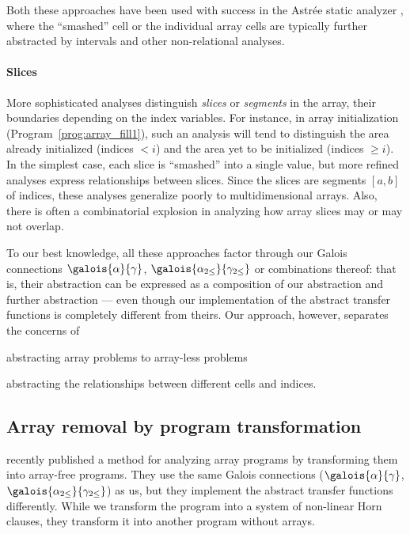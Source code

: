 \documentclass[a4paper]{article}
\theoremstyle{definition}
\theoremstyle{plain}
\begin{document}
Both these approaches have been used with success in the Astr\'ee static analyzer \cite{BlanchetCousotEtAl02-NJ,BlanchetCousotEtAl_PLDI03}, where the ``smashed'' cell or the individual array cells are typically further abstracted by intervals and other non-relational analyses.

\paragraph{Slices}
More sophisticated analyses \cite{GopanRS05,HalbwachsP08,peron:tel-00623697,perrelle:tel-00973892,CousotCL11} distinguish \emph{slices}
or \emph{segments} in the array, their boundaries depending on the index variables.
For instance, in array initialization (Program~\ref{prog:array_fill1}), such an analysis will tend to distinguish the area already initialized (indices $<i$) and the area yet to be initialized (indices $\geq i$).
In the simplest case, each slice is ``smashed'' into a single value, but more refined analyses express relationships between slices.
Since the slices are segments $[a,b]$ of indices, these analyses generalize poorly to multidimensional arrays.
Also, there is often a combinatorial explosion in analyzing how array slices may or may not overlap.

To our best knowledge, all these approaches factor through our Galois connections $\galois{\alpha}{\gamma}$, $\galois{\alpha_{2\leq}}{\gamma_{2\leq}}$ or combinations thereof: that is, their abstraction can be expressed as a composition of our abstraction and further abstraction
--- even though our implementation of the abstract transfer functions is completely different from theirs.
Our approach, however, separates the concerns of
\begin{inparaenum}[i)]
\item abstracting array problems to array-less problems
\item abstracting the relationships between different cells and indices.
\end{inparaenum}

\subsection{Array removal by program transformation}
\label{sec:abstraction_weak_transfo}
\citet{Monniaux_Alberti_SAS2015} recently published a method for analyzing array programs by transforming them into array-free programs.
They use the same Galois connections ($\galois{\alpha}{\gamma}$, $\galois{\alpha_{2\leq}}{\gamma_{2\leq}}$) as us, but they implement the abstract transfer functions differently.
While we transform the program into a system of non-linear Horn clauses, they transform it into another program without arrays.
\end{document}
